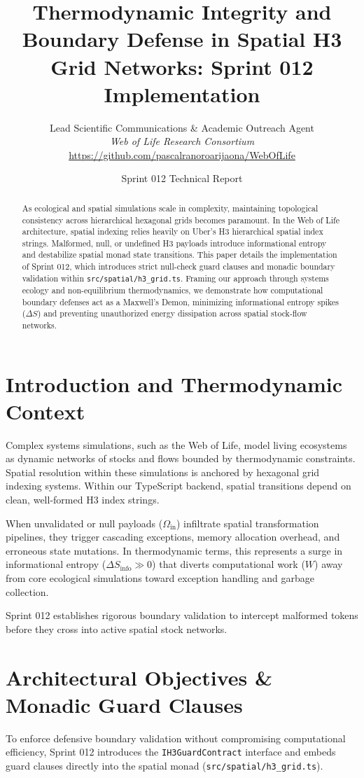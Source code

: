 \documentclass[11pt, a4paper]{article}
\title{\textbf{Thermodynamic Integrity and Boundary Defense in Spatial H3 Grid Networks: Sprint 012 Implementation}}
\author{
    Lead Scientific Communications \& Academic Outreach Agent \\
    \textit{Web of Life Research Consortium} \\
    \href{https://github.com/pascalranoroarijaona/WebOfLife}{https://github.com/pascalranoroarijaona/WebOfLife}
}
\date{Sprint 012 Technical Report}
\begin{document}
\maketitle

\begin{abstract}
As ecological and spatial simulations scale in complexity, maintaining topological consistency across hierarchical hexagonal grids becomes paramount. In the Web of Life architecture, spatial indexing relies heavily on Uber's H3 hierarchical spatial index strings. Malformed, null, or undefined H3 payloads introduce informational entropy and destabilize spatial monad state transitions. This paper details the implementation of Sprint 012, which introduces strict null-check guard clauses and monadic boundary validation within \texttt{src/spatial/h3\_grid.ts}. Framing our approach through systems ecology and non-equilibrium thermodynamics, we demonstrate how computational boundary defenses act as a Maxwell's Demon, minimizing informational entropy spikes ($\Delta S$) and preventing unauthorized energy dissipation across spatial stock-flow networks.
\end{abstract}

\section{Introduction and Thermodynamic Context}
Complex systems simulations, such as the Web of Life, model living ecosystems as dynamic networks of stocks and flows bounded by thermodynamic constraints. Spatial resolution within these simulations is anchored by hexagonal grid indexing systems. Within our TypeScript backend, spatial transitions depend on clean, well-formed H3 index strings. 

When unvalidated or null payloads ($\Omega_{\text{in}}$) infiltrate spatial transformation pipelines, they trigger cascading exceptions, memory allocation overhead, and erroneous state mutations. In thermodynamic terms, this represents a surge in informational entropy ($\Delta S_{\text{info}} \gg 0$) that diverts computational work ($W$) away from core ecological simulations toward exception handling and garbage collection.

Sprint 012 establishes rigorous boundary validation to intercept malformed tokens before they cross into active spatial stock networks.

\section{Architectural Objectives \& Monadic Guard Clauses}
To enforce defensive boundary validation without compromising computational efficiency, Sprint 012 introduces the \texttt{IH3GuardContract} interface and embeds guard clauses directly into the spatial monad (\texttt{src/spatial/h3\_grid.ts}).
\end{document}
